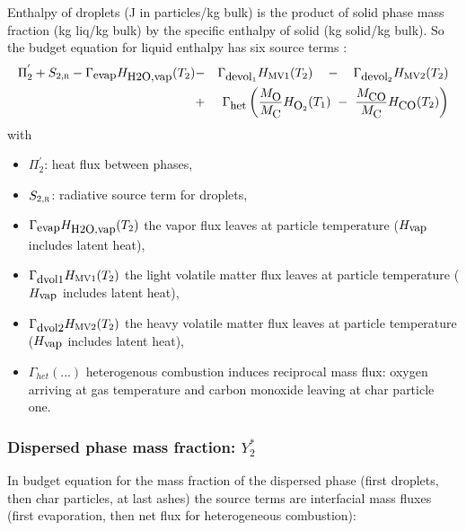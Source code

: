 Enthalpy of droplets (J in particles/kg bulk) is the product of solid phase mass
fraction (kg liq/kg bulk) by the specific enthalpy of solid (kg solid/kg
bulk). So the budget equation for liquid enthalpy has six source terms :
\begin{eqnarray}
\Pi_{2}^{'}+S_{2,\mbox{\scriptsize\textsc{r}}}-\Gamma_{\mbox{\small evap}}H_{\mbox{\small H2O,vap}}(T_{2}) & - & \Gamma_{\mbox{\small devol}_1}H_{\mbox{\scriptsize MV1}}(T_{2})\quad-\quad \Gamma_{\mbox{\small devol}_2}H_{\mbox{\scriptsize MV2}}(T_{2}) \nonumber\\
                                                   & + &\Gamma_{\mbox{\small het}}\left( \frac{M_{\mbox{\small O}}}{M_{\mbox{\small C}}}H_{\mbox{\small O}_{2}}(T_{1})~ - ~\frac{M_{\mbox{\small CO}}}{M_{\mbox{\small C}}}H_{\mbox{\small CO}}(T_{2})\right) 
\end{eqnarray}
with
\begin{itemize}
  \item $\Pi_{2}^{'}$: heat flux between phases,
  \item $S_{2,\mbox{\scriptsize\textsc{r}}}$: radiative source term for droplets,
  \item $\Gamma_{\mbox{\small evap}}H_{\mbox{\small H2O,vap}}(T_{2})$ the vapor
    flux leaves at particle temperature ($H_{\mbox{\small vap}}$ includes latent
    heat),
  \item $\Gamma_{\mbox{\small dvol1}}H_{\mbox{\scriptsize MV1}}(T_{2})$ the
    light volatile matter flux leaves at particle temperature ($H_{\mbox{\small
        vap}}$ includes latent heat),
  \item $\Gamma_{\mbox{\small dvol2}}H_{\mbox{\scriptsize MV2}}(T_{2})$ the
    heavy volatile matter flux leaves at particle temperature ($H_{\mbox{\small
        vap}}$ includes latent heat),
  \item $\Gamma_{het}(...)$ heterogenous combustion induces reciprocal mass
    flux: oxygen arriving at gas temperature and carbon monoxide leaving at char
    particle one.
\end{itemize}

\subsubsection*{Dispersed phase mass fraction: $Y_{2}^{*}$}

In budget equation for the mass fraction of the dispersed phase (first droplets,
then char particles, at last ashes) the source terms are interfacial mass fluxes
(first evaporation, then net flux for heterogeneous combustion):

